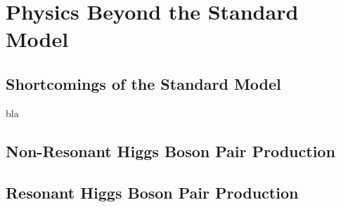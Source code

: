 \section{Physics Beyond the Standard Model}

\subsection{Shortcomings of the Standard Model}

\begin{description}

\item[bla]

\end{description}


\subsection{Non-Resonant Higgs Boson Pair Production}



\subsection{Resonant Higgs Boson Pair Production}



